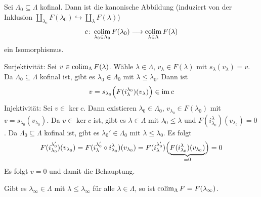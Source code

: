 \begin{lemma}[{name=[Isomorphismus zum Kolimes einer kofinalen Teilmenge]}]
	Sei $\Lambda_0 \subseteq \Lambda$ kofinal. Dann ist die kanonische Abbildung (induziert von der Inklusion $\coprod_{\lambda_0} F(\lambda_0) \hookrightarrow \coprod_{\lambda} F(\lambda)$)
	\[
		c \colon \colim_{\lambda_0 \in \Lambda_0} F(\lambda_0) \longrightarrow \colim_{\lambda \in \Lambda} F(\lambda)
	\]
	ein Isomorphismus.
\end{lemma}
\begin{beweis}
	Surjektivität: Sei $v \in \colim_\Lambda F(\lambda)$. Wähle $\lambda \in \Lambda$, $v_\lambda \in F(\lambda)$ mit $s_\lambda(v_\lambda)=v$. 
	Da $\Lambda_0 \subseteq \Lambda$ kofinal ist, gibt es $\lambda_0 \in \Lambda_0$ mit $\lambda \le \lambda_0$. 
	Dann ist
	\[
		v = s_{\lambda_0} \enbrace*{F(i_\lambda^{\lambda_0})(v_\lambda)} \in \im c
	\]
	Injektivität: Sei $v \in \ker c$. Dann existieren $\lambda_0 \in \Lambda_0$, $v_{\lambda_0} \in F(\lambda_0)$ mit $v=s_{\lambda_0}(v_{\lambda_0})$. 
	Da $v \in \ker c$ ist, gibt es $\lambda \in \Lambda$ mit $\lambda_0 \le \lambda$ und $F(i_{\lambda_0}^{\lambda})(v_{\lambda_0}) =0$. 
	Da $\Lambda_0 \subseteq \Lambda$ kofinal ist, gibt es $\lambda_0' \in \Lambda_0$ mit $\lambda \le \lambda_0$. 
	Es folgt 
	\begin{align}
		F(i_{\lambda_0}^{\lambda_0'})(v_{\lambda_0}) = F (i_\lambda^{\lambda_0'} \circ i_{\lambda_0}^\lambda)(v_{\lambda_0}) = F(i_{\lambda}^{\lambda_0'}) \enbrace[\Big]{\Underbrace{F(i_{\lambda_0}^\lambda)(v_{\lambda_0})}{=0}} = 0
	\end{align}
	Es folgt $v=0$ und damit die Behauptung.
\end{beweis}

\begin{korollarB}
	Gibt es $\lambda_\infty \in \Lambda$ mit $\lambda \le \lambda_\infty$ für alle $\lambda \in \Lambda$, so ist $\colim_\Lambda F = F(\lambda_\infty)$.
\end{korollarB}

